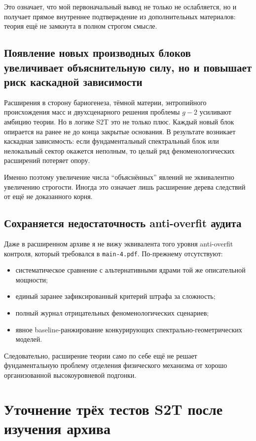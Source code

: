 \documentclass[12pt,a4paper]{article}
\begin{document}
Это означает, что мой первоначальный вывод не только не ослабляется, но и получает прямое внутреннее подтверждение из дополнительных материалов: теория ещё не замкнута в полном строгом смысле.

\subsection{Появление новых производных блоков увеличивает объяснительную силу, но и повышает риск каскадной зависимости}

Расширения в сторону бариогенеза, тёмной материи, энтропийного происхождения масс и двухсценарного решения проблемы \(g-2\) усиливают амбицию теории. Но в логике S2T это не только плюс. Каждый новый блок опирается на ранее не до конца закрытые основания. В результате возникает каскадная зависимость: если фундаментальный спектральный блок или нелокальный сектор окажется неполным, то целый ряд феноменологических расширений потеряет опору.

Именно поэтому увеличение числа ``объяснённых'' явлений не эквивалентно увеличению строгости. Иногда это означает лишь расширение дерева следствий от ещё не доказанного корня.

\subsection{Сохраняется недостаточность anti-overfit аудита}

Даже в расширенном архиве я не вижу эквивалента того уровня anti-overfit контроля, который требовался в \texttt{main-4.pdf}. По-прежнему отсутствуют:
\begin{itemize}
    \item систематическое сравнение с альтернативными ядрами той же описательной мощности;
    \item единый заранее зафиксированный критерий штрафа за сложность;
    \item полный журнал отрицательных феноменологических сценариев;
    \item явное baseline-ранжирование конкурирующих спектрально-геометрических моделей.
\end{itemize}

Следовательно, расширение теории само по себе ещё не решает фундаментальную проблему отделения физического механизма от хорошо организованной высокоуровневой подгонки.

\section{Уточнение трёх тестов S2T после изучения архива}
\end{document}
